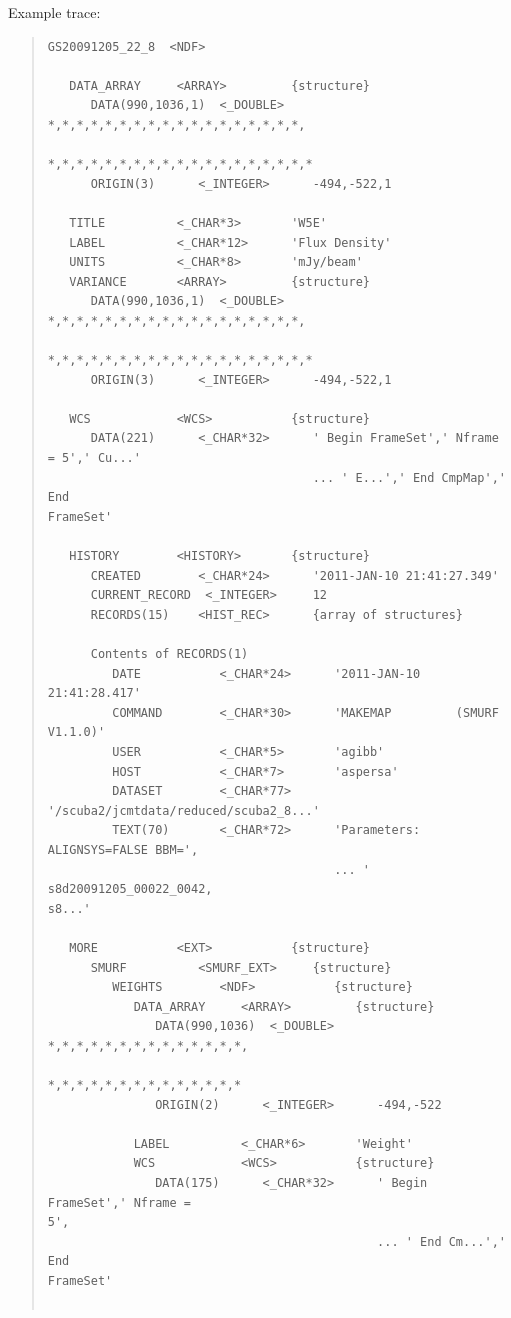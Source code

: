 \documentclass[twoside,11pt]{article}
\renewcommand{\_}{\texttt{\symbol{95}}}
\newenvironment{myquote}{\begin{quote}\begin{small}}{\end{small}\end{quote}}
\begin{document}
Example trace:
\begin{myquote}
\begin{verbatim}
GS20091205_22_8  <NDF>

   DATA_ARRAY     <ARRAY>         {structure}
      DATA(990,1036,1)  <_DOUBLE>    *,*,*,*,*,*,*,*,*,*,*,*,*,*,*,*,*,*,
                                     *,*,*,*,*,*,*,*,*,*,*,*,*,*,*,*,*,*,*
      ORIGIN(3)      <_INTEGER>      -494,-522,1

   TITLE          <_CHAR*3>       'W5E'
   LABEL          <_CHAR*12>      'Flux Density'
   UNITS          <_CHAR*8>       'mJy/beam'
   VARIANCE       <ARRAY>         {structure}
      DATA(990,1036,1)  <_DOUBLE>    *,*,*,*,*,*,*,*,*,*,*,*,*,*,*,*,*,*,
                                     *,*,*,*,*,*,*,*,*,*,*,*,*,*,*,*,*,*,*
      ORIGIN(3)      <_INTEGER>      -494,-522,1

   WCS            <WCS>           {structure}
      DATA(221)      <_CHAR*32>      ' Begin FrameSet',' Nframe = 5',' Cu...'
                                     ... ' E...',' End CmpMap',' End
FrameSet'

   HISTORY        <HISTORY>       {structure}
      CREATED        <_CHAR*24>      '2011-JAN-10 21:41:27.349'
      CURRENT_RECORD  <_INTEGER>     12
      RECORDS(15)    <HIST_REC>      {array of structures}

      Contents of RECORDS(1)
         DATE           <_CHAR*24>      '2011-JAN-10 21:41:28.417'
         COMMAND        <_CHAR*30>      'MAKEMAP         (SMURF V1.1.0)'
         USER           <_CHAR*5>       'agibb'
         HOST           <_CHAR*7>       'aspersa'
         DATASET        <_CHAR*77>
'/scuba2/jcmtdata/reduced/scuba2_8...'
         TEXT(70)       <_CHAR*72>      'Parameters: ALIGNSYS=FALSE BBM=',
                                        ... '   s8d20091205_00022_0042,
s8...'

   MORE           <EXT>           {structure}
      SMURF          <SMURF_EXT>     {structure}
         WEIGHTS        <NDF>           {structure}
            DATA_ARRAY     <ARRAY>         {structure}
               DATA(990,1036)  <_DOUBLE>      *,*,*,*,*,*,*,*,*,*,*,*,*,*,
                                              *,*,*,*,*,*,*,*,*,*,*,*,*,*
               ORIGIN(2)      <_INTEGER>      -494,-522

            LABEL          <_CHAR*6>       'Weight'
            WCS            <WCS>           {structure}
               DATA(175)      <_CHAR*32>      ' Begin FrameSet',' Nframe =
5',
                                              ... ' End Cm...',' End
FrameSet'


\end{verbatim}
\end{myquote}
\end{document}
